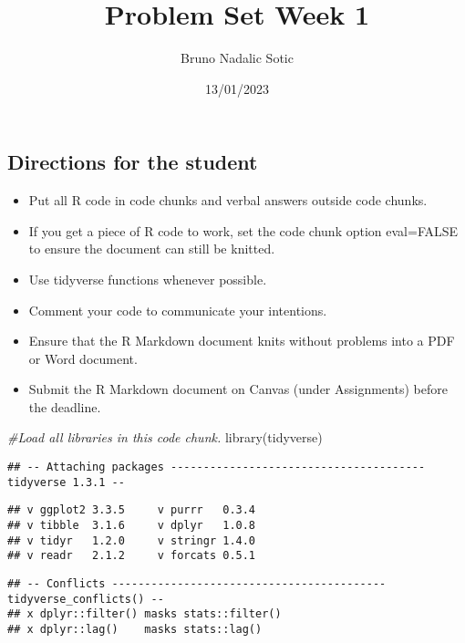 \documentclass[
]{article}
\title{Problem Set Week 1}
\author{Bruno Nadalic Sotic}
\date{13/01/2023}
\newenvironment{Shaded}{\begin{snugshade}}{\end{snugshade}}
\newcommand{\CommentTok}[1]{\textcolor[rgb]{0.56,0.35,0.01}{\textit{#1}}}
\newcommand{\FunctionTok}[1]{\textcolor[rgb]{0.00,0.00,0.00}{#1}}
\newcommand{\NormalTok}[1]{#1}
\providecommand{\tightlist}{%
  \setlength{\itemsep}{0pt}\setlength{\parskip}{0pt}}
\begin{document}
\maketitle

{
\setcounter{tocdepth}{2}
\tableofcontents
}
\hypertarget{directions-for-the-student}{%
\subsection{Directions for the
student}\label{directions-for-the-student}}

\begin{itemize}
\tightlist
\item
  Put all R code in code chunks and verbal answers outside code chunks.
\item
  If you get a piece of R code to work, set the code chunk option
  eval=FALSE to ensure the document can still be knitted.
\item
  Use tidyverse functions whenever possible.
\item
  Comment your code to communicate your intentions.
\item
  Ensure that the R Markdown document knits without problems into a PDF
  or Word document.
\item
  Submit the R Markdown document on Canvas (under Assignments) before
  the deadline.
\end{itemize}

\begin{Shaded}
\begin{Highlighting}[]
\CommentTok{\#Load all libraries in this code chunk.}
\FunctionTok{library}\NormalTok{(tidyverse)}
\end{Highlighting}
\end{Shaded}

\begin{verbatim}
## -- Attaching packages --------------------------------------- tidyverse 1.3.1 --
\end{verbatim}

\begin{verbatim}
## v ggplot2 3.3.5     v purrr   0.3.4
## v tibble  3.1.6     v dplyr   1.0.8
## v tidyr   1.2.0     v stringr 1.4.0
## v readr   2.1.2     v forcats 0.5.1
\end{verbatim}

\begin{verbatim}
## -- Conflicts ------------------------------------------ tidyverse_conflicts() --
## x dplyr::filter() masks stats::filter()
## x dplyr::lag()    masks stats::lag()
\end{verbatim}
\end{document}
